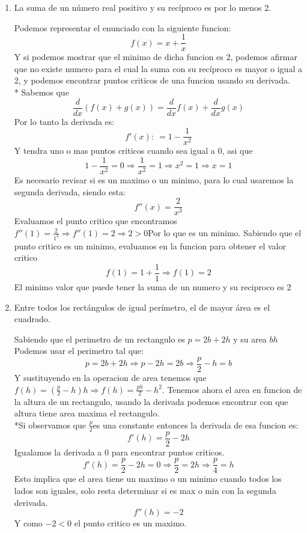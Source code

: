\documentclass[12pt]{article}
\begin{document}
\begin{enumerate}[\hspace{9px} a)]
    \item La suma de un n\'umero real positivo y su rec\'iproco es por lo menos 2.\medskip
    
    Podemos representar el enunciado con la siguiente funcion:
    \[f(x) = x+\displaystyle\frac{1}{x}\] 
    Y si podemos mostrar que el minimo de dicha funcion es 2, podemos afirmar que no existe numero para el cual la suma con su rec\'iproco es mayor o igual a 2, y podemos encontrar puntos criticos de una funcion usando su derivada.\\*
    Sabemos que \[\displaystyle\frac{d}{dx}(f(x)+g(x)) = \displaystyle\frac{d}{dx}f(x)+\displaystyle\frac{d}{dx}g(x)\]
    Por lo tanto la derivada es: 
    \[f'(x): \ = 1-\displaystyle\frac{1}{x^2}\]
    Y tendra uno o mas puntos criticos cuando sea igual a 0, asi que \[1-\displaystyle\frac{1}{x^2}=0\Rightarrow\displaystyle\frac{1}{x^2}=1\Rightarrow x^2 = 1 \Rightarrow x=1\]   
    Es necesario revisar si es un maximo o un minimo, para lo cual usaremos la segunda derivada, siendo esta: \[f''(x)=\displaystyle\frac{2}{x^3}\]
    Evaluamos el punto critico que encontramos \(f''(1)=\displaystyle\frac{2}{1^3}\Rightarrow f''(1)=2\Rightarrow 2>0\)\quad Por lo que es un minimo.
    Sabiendo que el punto critico es un minimo, evaluamos en la funcion para obtener el valor critico
    \[f(1)=1+\displaystyle\frac{1}{1}\Rightarrow f(1)=2\]
    El minimo valor que puede tener la suma de un numero y su reciproco es 2\medskip

    \item Entre todos los rect\'angulos de igual per\'imetro, el de mayor \'area es el cuadrado.\medskip
    
    Sabiendo que el perimetro de un rectangulo es \(p=2b+2h\) y su area \(bh\)
    Podemos usar el perimetro tal que: \[p=2b+2h\Rightarrow p-2h=2b\Rightarrow \displaystyle\frac{p}{2}-h=b\]
    Y sustituyendo en la operacion de area tenemos que \(f(h)=(\displaystyle\frac{p}{2}-h)h\Rightarrow f(h)=\displaystyle\frac{ph}{2}-h^2\).
    Tenemos ahora el area en funcion de la altura de un rectangulo, usando la derivada podemos encontrar con que altura tiene area maxima el rectangulo. \\*Si observamos que \(\displaystyle\frac{p}{2}\)es una constante entonces la derivada de esa funcion es: 
    \[f'(h)=\displaystyle\frac{p}{2}-2h\]
    Igualamos la derivada a 0 para encontrar puntos criticos.
    \[f'(h)=\displaystyle\frac{p}{2}-2h=0\Rightarrow \displaystyle\frac{p}{2}=2h\Rightarrow \displaystyle\frac{p}{4}=h\]
    Esto implica que el area tiene un maximo o un minimo cuando todos los lados son iguales, solo resta determinar si es max o min con la segunda derivada.
    \[f''(h)=-2\]
    Y como \(-2<0\) el punto critico es un maximo.\medskip


\end{enumerate}
\end{document}

